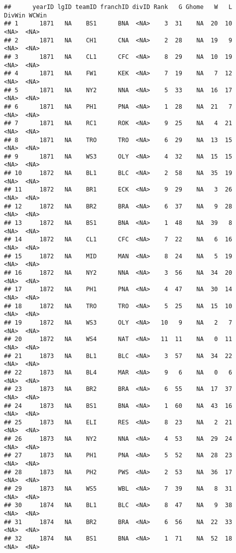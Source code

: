 \documentclass[]{article}
\begin{document}
\begin{verbatim}
##      yearID lgID teamID franchID divID Rank   G Ghome   W   L DivWin WCWin
## 1      1871   NA    BS1      BNA  <NA>    3  31    NA  20  10   <NA>  <NA>
## 2      1871   NA    CH1      CNA  <NA>    2  28    NA  19   9   <NA>  <NA>
## 3      1871   NA    CL1      CFC  <NA>    8  29    NA  10  19   <NA>  <NA>
## 4      1871   NA    FW1      KEK  <NA>    7  19    NA   7  12   <NA>  <NA>
## 5      1871   NA    NY2      NNA  <NA>    5  33    NA  16  17   <NA>  <NA>
## 6      1871   NA    PH1      PNA  <NA>    1  28    NA  21   7   <NA>  <NA>
## 7      1871   NA    RC1      ROK  <NA>    9  25    NA   4  21   <NA>  <NA>
## 8      1871   NA    TRO      TRO  <NA>    6  29    NA  13  15   <NA>  <NA>
## 9      1871   NA    WS3      OLY  <NA>    4  32    NA  15  15   <NA>  <NA>
## 10     1872   NA    BL1      BLC  <NA>    2  58    NA  35  19   <NA>  <NA>
## 11     1872   NA    BR1      ECK  <NA>    9  29    NA   3  26   <NA>  <NA>
## 12     1872   NA    BR2      BRA  <NA>    6  37    NA   9  28   <NA>  <NA>
## 13     1872   NA    BS1      BNA  <NA>    1  48    NA  39   8   <NA>  <NA>
## 14     1872   NA    CL1      CFC  <NA>    7  22    NA   6  16   <NA>  <NA>
## 15     1872   NA    MID      MAN  <NA>    8  24    NA   5  19   <NA>  <NA>
## 16     1872   NA    NY2      NNA  <NA>    3  56    NA  34  20   <NA>  <NA>
## 17     1872   NA    PH1      PNA  <NA>    4  47    NA  30  14   <NA>  <NA>
## 18     1872   NA    TRO      TRO  <NA>    5  25    NA  15  10   <NA>  <NA>
## 19     1872   NA    WS3      OLY  <NA>   10   9    NA   2   7   <NA>  <NA>
## 20     1872   NA    WS4      NAT  <NA>   11  11    NA   0  11   <NA>  <NA>
## 21     1873   NA    BL1      BLC  <NA>    3  57    NA  34  22   <NA>  <NA>
## 22     1873   NA    BL4      MAR  <NA>    9   6    NA   0   6   <NA>  <NA>
## 23     1873   NA    BR2      BRA  <NA>    6  55    NA  17  37   <NA>  <NA>
## 24     1873   NA    BS1      BNA  <NA>    1  60    NA  43  16   <NA>  <NA>
## 25     1873   NA    ELI      RES  <NA>    8  23    NA   2  21   <NA>  <NA>
## 26     1873   NA    NY2      NNA  <NA>    4  53    NA  29  24   <NA>  <NA>
## 27     1873   NA    PH1      PNA  <NA>    5  52    NA  28  23   <NA>  <NA>
## 28     1873   NA    PH2      PWS  <NA>    2  53    NA  36  17   <NA>  <NA>
## 29     1873   NA    WS5      WBL  <NA>    7  39    NA   8  31   <NA>  <NA>
## 30     1874   NA    BL1      BLC  <NA>    8  47    NA   9  38   <NA>  <NA>
## 31     1874   NA    BR2      BRA  <NA>    6  56    NA  22  33   <NA>  <NA>
## 32     1874   NA    BS1      BNA  <NA>    1  71    NA  52  18   <NA>  <NA>

\end{verbatim}
\end{document}
